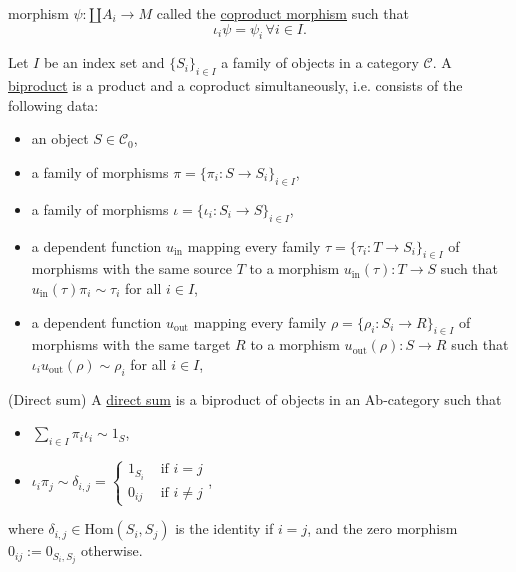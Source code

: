 \begin{definition}
\begin{description}
morphism $\psi : \amalg A_{i} \rightarrow M$ called the \ul{coproduct morphism} such that
\[
\iota_{i} \psi = \psi_{i} \, \forall i \in I.
\]
\end{description}
\end{definition}

\begin{definition}[Biproduct]\label{def:biproduct}
Let $I$ be an index set and $\{S_{i}\}_{i\in I}$ a family of objects in a category $\mathcal{C}$.
A \ul{biproduct} is a product and a coproduct simultaneously, i.e. consists of the following data:
\begin{itemize}
\item an object $S \in \mathcal{C}_{0}$,
\item a family of morphisms $\pi = \{ \pi_{i} : S \rightarrow S_{i} \}_{i\in I}$,
\item a family of morphisms $\iota = \{ \iota_{i} : S_{i} \rightarrow S \}_{i\in I}$,
\item a dependent function $u_{\text{in}}$ mapping every family $\tau = \{ \tau_{i} : T \rightarrow S_{i} \}_{i\in I}$ of morphisms
with the same source $T$ to a morphism
$u_{\text{in}}(\tau) : T \rightarrow S$ such that $u_{\text{in}}(\tau) \pi_{i} \sim \tau_{i}$ for all $i \in I$,
\item a dependent function $u_{\text{out}}$ mapping every family $\rho = \{ \rho_{i} : S_{i} \rightarrow R \}_{i\in I}$ of morphisms
with the same target $R$ to a morphism
$u_{\text{out}}(\rho) : S \rightarrow R$ such that $\iota_{i} u_{\text{out}}(\rho) \sim \rho_{i}$ for all $i \in I$,
\end{itemize}
\end{definition}

\begin{definition}{(Direct sum)}\label{def:direct_sum}
A \ul{direct sum} is a biproduct of objects in an Ab-category such that
\begin{itemize}
\item $\sum_{i\in I}  \pi_{i} \iota_{i} \sim 1_{S}$,
\item $ \iota_{i} \pi_{j} \sim \delta_{i, j} =  \begin{cases}
            1_{S_{i}} & \text{ if } i = j  \\
            0_{ij} & \text{ if } i \neq j
        \end{cases}$,
\end{itemize}
where $\delta_{i, j} \in \mathrm{Hom}(S_{i}, S_{j})$ is the identity if $i = j$, and the zero morphism $0_{ij} := 0_{S_{i}, S_{j}}$ otherwise.
\end{definition}

